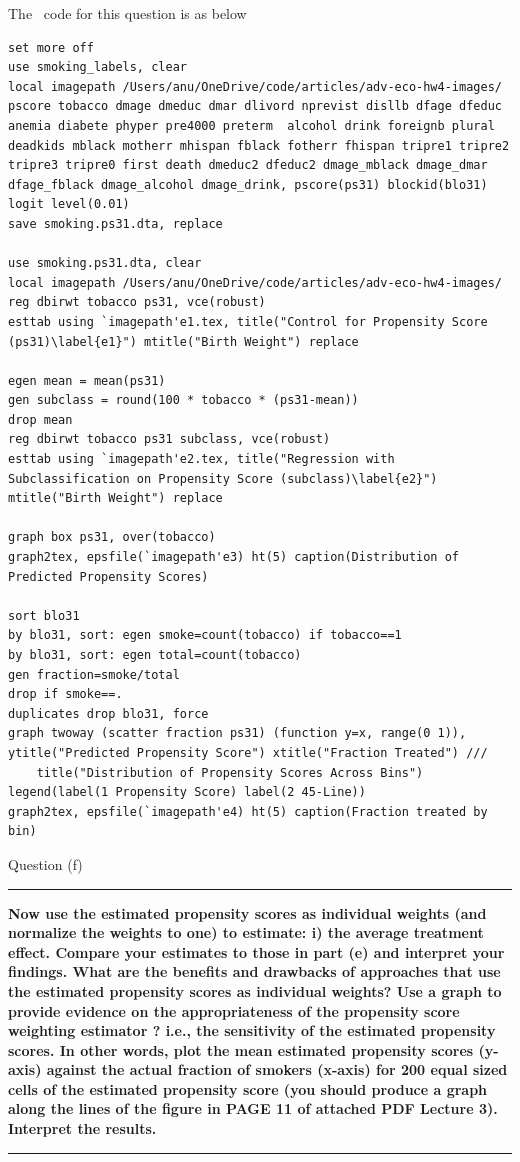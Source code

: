 \documentclass[12pt]{article}
\newcommand\question[1]{\vspace{1em}\hrule\vspace{1em}\textbf{#1}\vspace{1em}\hrule\vspace{1em}}
\begin{document}
The \stata \ code   for this question is as below
\begin{lstlisting}
set more off
use smoking_labels, clear
local imagepath /Users/anu/OneDrive/code/articles/adv-eco-hw4-images/
pscore tobacco dmage dmeduc dmar dlivord nprevist disllb dfage dfeduc  anemia diabete phyper pre4000 preterm  alcohol drink foreignb plural deadkids mblack motherr mhispan fblack fotherr fhispan tripre1 tripre2 tripre3 tripre0 first death dmeduc2 dfeduc2 dmage_mblack dmage_dmar dfage_fblack dmage_alcohol dmage_drink, pscore(ps31) blockid(blo31) logit level(0.01)
save smoking.ps31.dta, replace

use smoking.ps31.dta, clear
local imagepath /Users/anu/OneDrive/code/articles/adv-eco-hw4-images/
reg dbirwt tobacco ps31, vce(robust)
esttab using `imagepath'e1.tex, title("Control for Propensity Score (ps31)\label{e1}") mtitle("Birth Weight") replace

egen mean = mean(ps31)
gen subclass = round(100 * tobacco * (ps31-mean))
drop mean
reg dbirwt tobacco ps31 subclass, vce(robust)
esttab using `imagepath'e2.tex, title("Regression with Subclassification on Propensity Score (subclass)\label{e2}") mtitle("Birth Weight") replace

graph box ps31, over(tobacco)
graph2tex, epsfile(`imagepath'e3) ht(5) caption(Distribution of Predicted Propensity Scores)

sort blo31
by blo31, sort: egen smoke=count(tobacco) if tobacco==1
by blo31, sort: egen total=count(tobacco)
gen fraction=smoke/total
drop if smoke==.
duplicates drop blo31, force
graph twoway (scatter fraction ps31) (function y=x, range(0 1)), ytitle("Predicted Propensity Score") xtitle("Fraction Treated") ///
	title("Distribution of Propensity Scores Across Bins") legend(label(1 Propensity Score) label(2 45-Line))
graph2tex, epsfile(`imagepath'e4) ht(5) caption(Fraction treated by bin)

\end{lstlisting}


\newpage
\begin{center}\LARGE{Question (f)}\end{center}
\question{Now use the estimated propensity scores as individual weights (and normalize the weights to one) to estimate: i) the average treatment effect.  Compare your estimates to those in part (e) and interpret your findings.  What are the benefits and drawbacks of approaches that use the estimated propensity scores as individual weights?  Use a graph to provide evidence on the appropriateness of the propensity score weighting estimator ? i.e., the sensitivity of the estimated propensity scores. In other words, plot the mean estimated propensity scores (y-axis) against the actual fraction of smokers (x-axis) for 200 equal sized cells of the estimated propensity score (you should produce a graph along the lines of the figure in PAGE 11 of attached PDF Lecture 3).  Interpret the results.}
\end{document}
